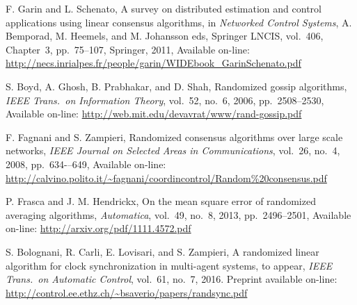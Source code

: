 \documentclass{article}
\begin{document}
\begin{thebibliography}{99}

F. Garin and L. Schenato, A survey on distributed estimation and control applications using linear consensus algorithms, in {\it Networked Control Systems}, A. Bemporad, M. Heemels, and M. Johansson eds, Springer LNCIS, vol.~406, Chapter~3, pp.~75--107, Springer, 2011, Available on-line: \url{http://necs.inrialpes.fr/people/garin/WIDEbook_GarinSchenato.pdf}


S. Boyd, A. Ghosh, B. Prabhakar, and D. Shah, Randomized gossip algorithms, {\it IEEE Trans.\ on Information Theory}, vol.~52, no.~6, 2006, pp.~2508--2530, Available on-line: \url{http://web.mit.edu/devavrat/www/rand-gossip.pdf}


F. Fagnani and S. Zampieri, Randomized consensus algorithms over large scale networks,
{\it IEEE Journal on Selected Areas in Communications}, vol.~26, no.~4, 2008, pp.~634-–649, Available on-line:
\url{http://calvino.polito.it/~fagnani/coordincontrol/Random%20consensus.pdf}

P. Frasca and J. M. Hendrickx, On the mean square error of randomized averaging algorithms, {\it Automatica}, vol.~49, no.~8, 2013, pp.~2496--2501, Available on-line: \url{http://arxiv.org/pdf/1111.4572.pdf}

S. Bolognani, R. Carli, E. Lovisari, and S. Zampieri,
A randomized linear algorithm for clock synchronization in multi-agent systems,
to appear, {\it IEEE Trans.\ on Automatic Control}, vol.~61, no.~7, 2016.
Preprint available on-line:
\url{http://control.ee.ethz.ch/~bsaverio/papers/randsync.pdf}


\end{thebibliography}
\end{document}
